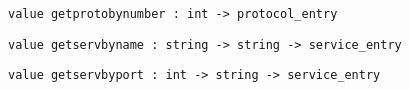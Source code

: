 %
\begin{comment}
 Find an entry in \verbprotocols with the given name, or raise
           \verbNot_found. 
\end{comment}
\begin{verbatim}
value getprotobynumber : int -> protocol_entry
\end{verbatim}
%
\begin{comment}
 Find an entry in \verbprotocols with the given protocol number,
           or raise \verbNot_found. 
\end{comment}
\begin{verbatim}
value getservbyname : string -> string -> service_entry
\end{verbatim}
%
\begin{comment}
 Find an entry in \verbservices with the given name, or raise
           \verbNot_found. 
\end{comment}
\begin{verbatim}
value getservbyport : int -> string -> service_entry
\end{verbatim}
%
\begin{comment}
 Find an entry in \verbservices with the given service number,
           or raise \verbNot_found. 
\end{comment}

